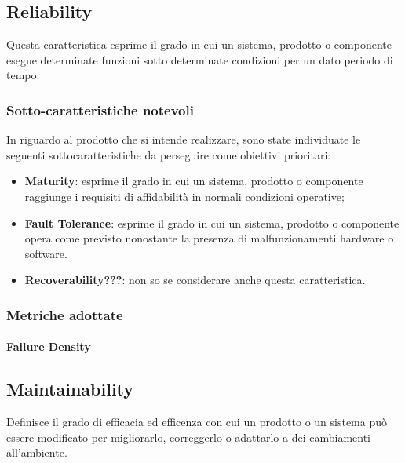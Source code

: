 \subsection{Reliability}
Questa caratteristica esprime il grado in cui un sistema, prodotto o componente esegue determinate funzioni sotto determinate condizioni per un dato periodo di tempo.
\subsubsection{Sotto-caratteristiche notevoli}
In riguardo al prodotto che si intende realizzare, sono state individuate le seguenti sottocaratteristiche da perseguire come obiettivi prioritari: 
\begin{itemize}
	\item{\textbf{Maturity}}: esprime il grado in cui un sistema, prodotto o componente raggiunge i requisiti di affidabilità in normali condizioni operative;
	\item{\textbf{Fault Tolerance}}: esprime il grado in cui un sistema, prodotto o componente opera come previsto nonostante la presenza di malfunzionamenti hardware o software.
	\item{\textbf{Recoverability???}}: non so se considerare anche questa caratteristica.
\end{itemize}
\subsubsection{Metriche adottate}
\paragraph{Failure Density}

\subsection{Maintainability}
Definisce il grado di efficacia ed efficenza con cui un prodotto o un sistema può essere modificato per migliorarlo, correggerlo o adattarlo a dei cambiamenti all'ambiente. 
